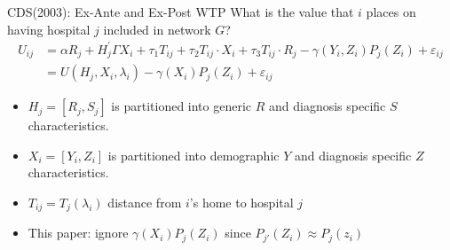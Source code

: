 \documentclass[xcolor=pdftex,dvipsnames,table,mathserif,aspectratio=169]{beamer}
\begin{document}
\begin{frame}{CDS(2003): Ex-Ante and Ex-Post WTP}
What is the value that $i$ places on having hospital $j$ included in network $G$?
\begin{align*}
U_{i j} &=\alpha R_{j}+H_{j}^{\prime} \Gamma X_{i}+\tau_{1} T_{i j}+\tau_{2} T_{i j} \cdot X_{i}+\tau_{3} T_{i j} \cdot R_{j}-\gamma\left(Y_{i}, Z_{i}\right) P_{j}\left(Z_{i}\right)+\varepsilon_{i j} \\ &=U\left(H_{j}, X_{i}, \lambda_{i}\right)-\gamma\left(X_{i}\right) P_{j}\left(Z_{i}\right)+\varepsilon_{i j} 
\end{align*}

\begin{itemize}
\item $H_{j}=\left[R_{j}, S_{j}\right]$ is partitioned into generic $R$ and diagnosis specific $S$ characteristics.
\item $X_{i}=\left[Y_{i}, Z_{i}\right]$ is partitioned into demographic $Y$ and diagnosis specific $Z$ characteristics.
\item $T_{i j}=T_{j}\left(\lambda_{i}\right)$ distance from $i$'s home to hospital $j$
\item This paper: ignore $\gamma\left(X_{i}\right) P_{j}\left(Z_{i}\right)$ since $P_{j'}(Z_i) \approx P_j(z_i)$
\end{itemize}
\end{frame} 
\end{document}
